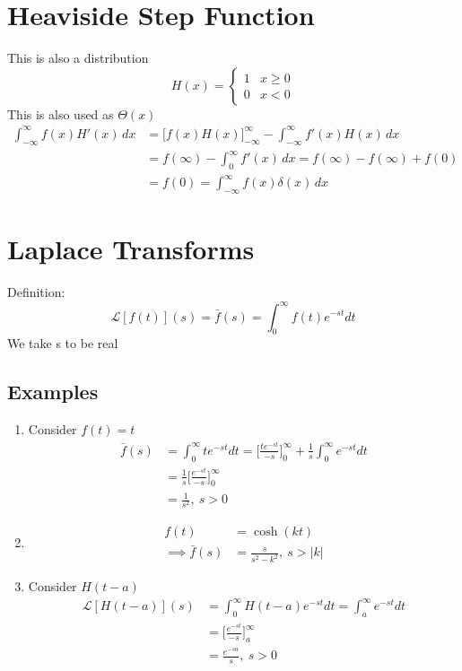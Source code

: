 \documentclass[a4paper, 11pt, normalem]{report}
\newcommand\ifnt{\int_{-\infty}^{\infty}}
\newcommand\ofnt{\int_{0}^{\infty}}
\newcommand\La{\mathcal{L}}
\begin{document}
\section{Heaviside Step Function}
This is also a distribution
\begin{equation*}
    H(x) =
    \begin{cases}
        1 & x \geq 0 \\
        0 & x < 0
    \end{cases}
\end{equation*}
This is also used as $\Theta(x)$
\begin{align*}
    \ifnt f(x)H'(x)\,dx &= \Big[f(x)H(x)\Big]_{-\infty}^{\infty} - \ifnt f'(x)H(x)\,dx \\
    &= f(\infty) - \ofnt f'(x)\,dx = f(\infty) - f(\infty) + f(0) \\
    &= f(0) = \ifnt f(x)\delta(x)\,dx
\end{align*}

\section{Laplace Transforms}
Definition:
\begin{equation*}
    \La[f(t)](s) = \bar{f}(s) = \ofnt f(t)e^{-st}dt
\end{equation*}
We take s to be real

\subsection{Examples}
\begin{enumerate}
    \item Consider $f(t) = t$
            \begin{align*}
                \bar{f}(s) &= \ofnt te^{-st}dt = \Big[\frac{te^{-st}}{-s}\Big]_{0}^{\infty} + \frac{1}{s} \ofnt e^{-st}dt \\
                &= \frac{1}{s} \Big[\frac{e^{-st}}{-s}\Big]_{0}^{\infty} \\
                &= \frac{1}{s^2},~ s > 0
            \end{align*}
    \item   \begin{align*}
                f(t) &= \cosh(kt) \\
                \implies \bar{f}(s) &= \frac{s}{s^2 - k^2},~ s > |k|
            \end{align*}
    \item Consider $H(t - a)$
            \begin{align*}
                \La[H(t - a)](s) &= \ofnt H(t - a)e^{-st}dt = \int_{a}^{\infty} e^{-st}dt \\
                &= \Big[\frac{e^{-st}}{-s}\Big]_{a}^{\infty} \\
                &= \frac{e^{-sa}}{s},~ s > 0
            \end{align*}
\end{enumerate}
\end{document}
